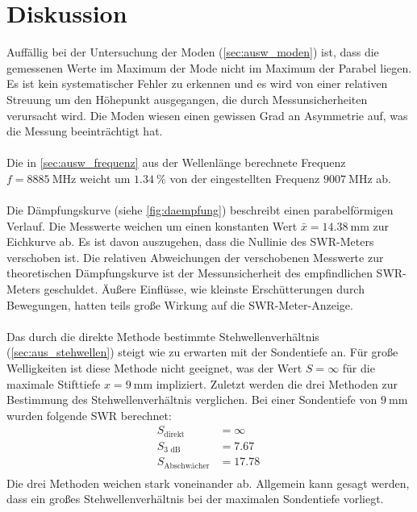\section{Diskussion}
\label{sec:Diskussion}
Auffällig bei der Untersuchung der Moden (\autoref{sec:ausw_moden}) ist, dass die gemessenen Werte im Maximum der Mode nicht im Maximum der Parabel liegen.
Es ist kein systematischer Fehler zu erkennen und es wird von einer relativen Streuung um den Höhepunkt ausgegangen, die durch Messunsicherheiten verursacht wird.
Die Moden wiesen einen gewissen Grad an Asymmetrie auf, was die Messung beeinträchtigt hat.
\\
\\
Die in \autoref{sec:ausw_frequenz} aus der Wellenlänge berechnete Frequenz $f = \SI{8885}{\mega\hertz}$ weicht um $\SI{1.34}{\percent}$ von der eingestellten Frequenz $\SI{9007}{\mega\hertz}$ ab.
\\
\\
Die Dämpfungskurve (siehe \autoref{fig:daempfung}) beschreibt einen parabelförmigen Verlauf.
Die Messwerte weichen um einen konstanten Wert $\bar{x} = \SI{14.38}{\milli\metre}$ zur Eichkurve ab.
Es ist davon auszugehen, dass die Nullinie des SWR-Meters verschoben ist.
Die relativen Abweichungen der verschobenen Messwerte zur theoretischen Dämpfungskurve ist der Messunsicherheit des empfindlichen SWR-Meters geschuldet.
Äußere Einflüsse, wie kleinste Erschütterungen durch Bewegungen, hatten teils große Wirkung auf die SWR-Meter-Anzeige.
\\
\\
Das durch die direkte Methode bestimmte Stehwellenverhältnis (\autoref{sec:aus_stehwellen}) steigt wie zu erwarten mit der Sondentiefe an.
Für große Welligkeiten ist diese Methode nicht geeignet, was der Wert $S = \infty$ für die maximale Stifttiefe $x = \SI{9}{\milli\metre}$ impliziert.
Zuletzt werden die drei Methoden zur Bestimmung des Stehwellenverhältnis verglichen.
Bei einer Sondentiefe von $\SI{9}{\milli\metre}$ wurden folgende SWR berechnet:
\begin{align*}
    S_\text{direkt} &= \infty \\
    S_\text{3 dB} &= \SI{7.67}{} \\
    S_\text{Abschwächer} &= \SI{17.78}{} \\
\end{align*}
Die drei Methoden weichen stark voneinander ab.
Allgemein kann gesagt werden, dass ein großes Stehwellenverhältnis bei der maximalen Sondentiefe vorliegt.